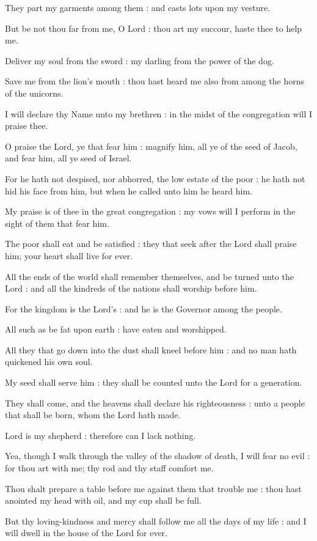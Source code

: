 They part my garments among them : and casts lots upon my vesture.\par
{}But be not thou far from me, O Lord : thou art my succour, haste thee to help me.\par
{}Deliver my soul from the sword : my darling from the power of the dog.\par
{}Save me from the lion's mouth : thou hast heard me also from among the horns of the unicorns.\par
{}I will declare thy Name unto my brethren : in the midst of the congregation will I praise thee.\par
{}O praise the Lord, ye that fear him : magnify him, all ye of the seed of Jacob, and fear him, all ye seed of Israel.\par
{}For he hath not despised, nor abhorred, the low estate of the poor : he hath not hid his face from him, but when he called unto him he heard him.\par
{}My praise is of thee in the great congregation : my vows will I perform in the sight of them that fear him.\par
{}The poor shall eat and be satisfied : they that seek after the Lord shall praise him; your heart shall live for ever.\par
{}All the ends of the world shall remember themselves, and be turned unto the Lord : and all the kindreds of the nations shall worship before him.\par
{}For the kingdom is the Lord's : and he is the Governor among the people.\par
{}All such as be fat upon earth : have eaten and worshipped.\par
{}All they that go down into the dust shall kneel before him : and no man hath quickened his own soul.\par
{}My seed shall serve him : they shall be counted unto the Lord for a generation.\par
{}They shall come, and the heavens shall declare his righteousness : unto a people that shall be born, whom the Lord hath made.\par


 Lord is my shepherd : therefore can I lack nothing.\par
{}
Yea, though I walk through the valley of the shadow of death, I will fear no evil : for thou art with me; thy rod and thy staff comfort me.\par
{}Thou shalt prepare a table before me against them that trouble me : thou hast anointed my head with oil, and my cup shall be full.\par
{}But thy loving-kindness and mercy shall follow me all the days of my life : and I will dwell in the house of the Lord for ever.\par

